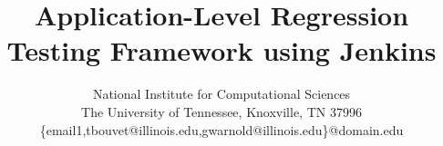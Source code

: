 \documentclass[10pt, conference, compsocconf]{IEEEtran}
\begin{document}
\title{Application-Level Regression Testing Framework using Jenkins}





%
\author{
National Institute for Computational Sciences\\
The University of Tennessee, Knoxville, TN 37996\\
\{email1,tbouvet@illinois.edu,gwarnold@illinois.edu\}@domain.edu}





\maketitle
\thispagestyle{plain}
\end{document}
